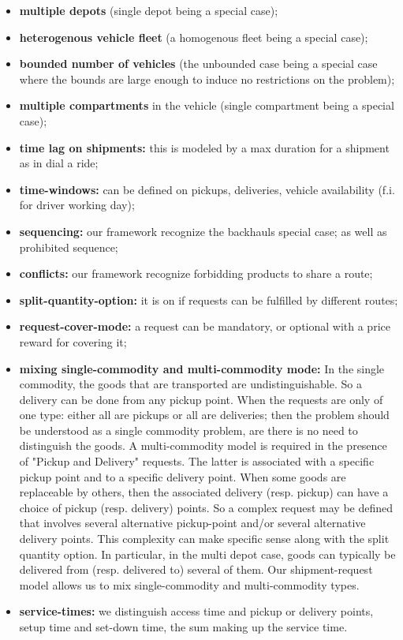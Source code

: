 \documentclass[12pt,a4paper]{article}
\begin{document}
\begin{itemize}
\item {\bf multiple depots} (single depot being a special case);
\item {\bf heterogenous vehicle fleet} (a homogenous fleet being a special case);
\item {\bf bounded number of vehicles} (the unbounded case  being  a special case where the bounds are large enough to induce no restrictions on the problem);
\item {\bf multiple compartments} in the vehicle (single compartment being a special case);
\item {\bf time lag on shipments:}  this is modeled by a max duration for a  shipment as in dial a ride;
\item {\bf time-windows:}  can be defined on pickups, deliveries, vehicle availability (f.i. for  driver working day);
\item {\bf sequencing:}  our framework recognize the  backhauls special case; as well as prohibited sequence;
\item {\bf  conflicts:}   our framework recognize forbidding products to share a route;
\item {\bf  split-quantity-option:} it is on if requests can be fulfilled by different routes;
\item {\bf  request-cover-mode:} a request can be mandatory, or  optional with a price reward for covering it;
\item {\bf mixing single-commodity and multi-commodity mode: } In the single commodity, the goods that are transported are undistinguishable. So a delivery can be done from any pickup point.  When the requests are only of one type: either all are pickups or all are deliveries; then the problem should be understood as a single commodity problem, are there is no need to distinguish the goods. A multi-commodity model is required in the presence of  "Pickup and Delivery" requests. The latter is associated with a  specific pickup point and to a specific delivery point. 
When some goods are replaceable by others, then the associated delivery (resp. pickup) can have a choice of pickup (resp. delivery) points. So a complex request may be defined that involves several alternative pickup-point and/or several alternative delivery points. This complexity can make specific sense along with the split quantity option. In particular, in the multi depot case, goods can typically be delivered from (resp. delivered to) several of them. Our shipment-request model allows us to mix single-commodity and multi-commodity types. 
\item {\bf  service-times:} we distinguish access time and pickup or delivery points, setup time and set-down time, the sum making up the service time.
\end{itemize}

\noindent 
\end{document}
